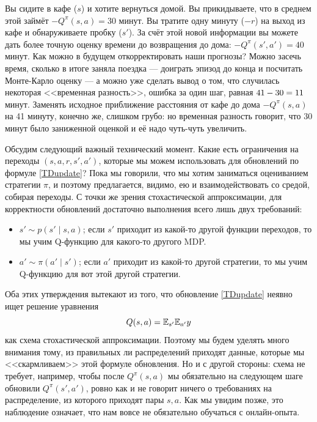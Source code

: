\begin{exampleBox}[label=ex:cafe]{}
Вы сидите в кафе ($s$) и хотите вернуться домой. Вы прикидываете, что в среднем этой займёт $-Q^\pi(s, a) = 30$ минут. Вы тратите одну минуту ($-r$) на выход из кафе и обнаруживаете пробку ($s'$). За счёт этой новой информации вы можете дать более точную оценку времени до возвращения до дома: $-Q^\pi(s', a') = 40$ минут. Как можно в будущем откорректировать наши прогнозы? Можно засечь время, сколько в итоге заняла поездка --- доиграть эпизод до конца и посчитать Монте-Карло оценку --- а можно уже сделать вывод о том, что случилась некоторая <<временная разность>>, ошибка за один шаг, равная $41 - 30 \HM= 11$ минут. Заменять исходное приближение расстояния от кафе до дома $-Q^\pi(s, a)$ на 41 минуту, конечно же, слишком грубо: но временная разность говорит, что 30 минут было заниженной оценкой и её надо чуть-чуть увеличить.
\end{exampleBox}

Обсудим следующий важный технический момент. Какие есть ограничения на переходы $(s, a, r, s', a')$, которые мы можем использовать для обновлений по формуле \eqref{TDupdate}? Пока мы говорили, что мы хотим заниматься оцениванием стратегии $\pi$, и поэтому предлагается, видимо, ею и взаимодействовать со средой, собирая переходы. С точки же зрения стохастической аппроксимации, для корректности обновлений достаточно выполнения всего лишь двух требований:
\begin{itemize}
    \item $s' \sim p(s' \mid s, a)$; если $s'$ приходит из какой-то другой функции переходов, то мы учим Q-функцию для какого-то другого MDP.
    \item $a' \sim \pi(a' \mid s')$; если $a'$ приходит из какой-то другой стратегии, то мы учим Q-функцию для вот этой другой стратегии.
\end{itemize}
Оба этих утверждения вытекают из того, что обновление \eqref{TDupdate} неявно ищет решение уравнения
$$Q(s, a) = \mathbb{E}_{s'} \mathbb{E}_{a'} y$$
как схема стохастической аппроксимации. Поэтому мы будем уделять много внимания тому, из правильных ли распределений приходят данные, которые мы <<скармливаем>> этой формуле обновления. Но и с другой стороны: схема не требует, например, чтобы после $Q^{\pi}(s, a)$ мы обязательно на следующем шаге обновили $Q^{\pi}(s', a')$, ровно как и не говорит ничего о требованиях на распределение, из которого приходят пары $s, a$. Как мы увидим позже, это наблюдение означает, что нам вовсе не обязательно обучаться с онлайн-опыта.


